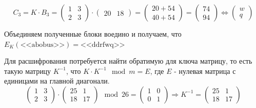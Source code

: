 \documentclass[a4paper]{article}
\begin{document}
  \begin{equation}
    C_3 = K\cdot B_3 = \begin{pmatrix}
        1 & 3 \\ 2 & 3
    \end{pmatrix} \cdot \begin{pmatrix}
        20 & 18
    \end{pmatrix} = \begin{pmatrix}
        20 + 54 \\ 40 + 54
    \end{pmatrix} = \begin{pmatrix}
        74 \\ 94
    \end{pmatrix} \Leftrightarrow \begin{pmatrix}
        w \\ q
    \end{pmatrix}
  \end{equation}

  Объединяем полученные блоки воедино и получаем, что $E_K(\text{<<abobus>>}) = \text{<<ddrfwq>>}$

  Для расшифрования потребуется найти обратимую для ключа матрицу, то есть такую матрицу $K^{-1}$,
  что $K\cdot K^{-1} \mod{m} = E$, где $E$ - нулевая матрица с единицами на главной диагонали.
  \begin{equation}
    \begin{pmatrix}
        1 & 3 \\ 2 & 3
    \end{pmatrix} \cdot \begin{pmatrix}
        25 & 1 \\ 18 & 17
    \end{pmatrix} \mod{26} = \begin{pmatrix}
        1 & 0 \\ 0 & 1
    \end{pmatrix} \Rightarrow K^{-1} = \begin{pmatrix}
        25 & 1 \\ 18 & 17
    \end{pmatrix}
  \end{equation}
\end{document}

